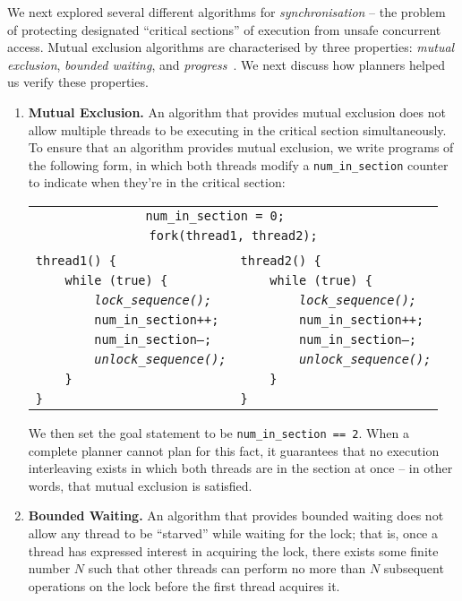We next explored several different algorithms for {\em synchronisation} -- the problem of protecting designated ``critical sections'' of execution from unsafe concurrent access. Mutual exclusion algorithms are characterised by three properties: {\em mutual exclusion}, {\em bounded waiting}, and {\em progress}~\cite{de0u}. We next discuss how planners helped us verify these properties.

\begin{enumerate}
	\item {\bf Mutual Exclusion.} An algorithm that provides mutual exclusion does not allow multiple threads to be executing in the critical section simultaneously.
	To ensure that an algorithm provides mutual exclusion, we write programs of the following form, in which both threads modify a \texttt{num\_in\_section} counter to indicate when they're in the critical section:
	\begin{center}
	\begin{tabular}{ll}
	\multicolumn{2}{c}{\texttt{num\_in\_section = 0;~~~~~}} \\
	\multicolumn{2}{c}{\texttt{fork(thread1, thread2);}} \\
	& \\
	\texttt{thread1() \{} & \texttt{thread2() \{} \\
	\texttt{~~~~while (true) \{} & \texttt{~~~~while (true) \{} \\
	\texttt{~~~~~~~~\em lock\_sequence();} & \texttt{~~~~~~~~\em lock\_sequence();} \\
	\texttt{~~~~~~~~num\_in\_section++;} & \texttt{~~~~~~~~num\_in\_section++;} \\
	\texttt{~~~~~~~~num\_in\_section--;} & \texttt{~~~~~~~~num\_in\_section--;} \\
	\texttt{~~~~~~~~\em unlock\_sequence();\qquad} & \texttt{~~~~~~~~\em unlock\_sequence();} \\
	\texttt{~~~~\}} & \texttt{~~~~\}} \\
	\texttt{\}} & \texttt{\}} \\
	\end{tabular}
	\end{center}
	We then set the goal statement to be \texttt{num\_in\_section == 2}. When a complete planner cannot plan for this fact, it guarantees that no execution interleaving exists in which both threads are in the section at once -- in other words, that mutual exclusion is satisfied.
	\item {\bf Bounded Waiting.} An algorithm that provides bounded waiting does not allow any thread to be ``starved'' while waiting for the lock; that is, once a thread has expressed interest in acquiring the lock, there exists some finite number $N$ such that other threads can perform no more than $N$ subsequent operations on the lock before the first thread acquires it.

\end{enumerate}
